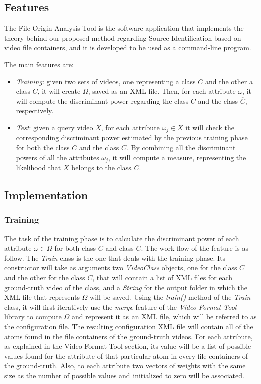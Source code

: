 \subsection{Features}

The File Origin Analysis Tool is the software application that implements the theory behind our proposed method regarding Source Identification based on video file containers, and it is developed to be used as a command-line program.

The main features are:
\begin{itemize}

\item \emph{Training}: given two sets of videos, one representing a class $C$ and the other a class $\overline{C}$, it will create $\Omega$, saved as an XML file. Then, for each attribute $\omega$, it will compute the discriminant power regarding the class $C$ and the class $\overline{C}$, respectively.

\item \emph{Test}: given a query video $X$, for each attribute $\omega_{j} \in X$ it will check the corresponding discriminant power estimated by the previous training phase for both the class $C$ and the class $\overline{C}$. By combining all the discriminant powers of all the attributes $\omega_{j}$, it will compute a measure, representing the likelihood that $X$ belongs to the class $C$.

\end{itemize}

\subsection{Implementation}

\subsubsection*{Training}

The task of the training phase is to calculate the discriminant power of each attribute $\omega \in \Omega$ for both class $C$ and class $\overline{C}$. The work-flow of the feature is as follow. The \emph{Train} class is the one that deals with the training phase. Its constructor will take as arguments two \emph{VideoClass} objects, one for the class $C$ and the other for the class $\overline{C}$, that will contain a list of XML files for each ground-truth video of the class, and a \emph{String} for the output folder in which the XML file that represents $\Omega$ will be saved.
Using the \emph{train()} method of the \emph{Train} class, it will first iteratively use the \emph{merge} feature of the \emph{Video Format Tool} library to compute $\Omega$ and represent it as an XML file, which will be referred to as the configuration file. The resulting configuration XML file will contain all of the atoms found in the file containers of the ground-truth videos. For each attribute, as explained in the Video Format Tool section, its value will be a list of possible values found for the attribute of that particular atom in every file containers of the ground-truth. Also, to each attribute two vectors of weights with the same size as the number of possible values and initialized to zero will be associated. 

